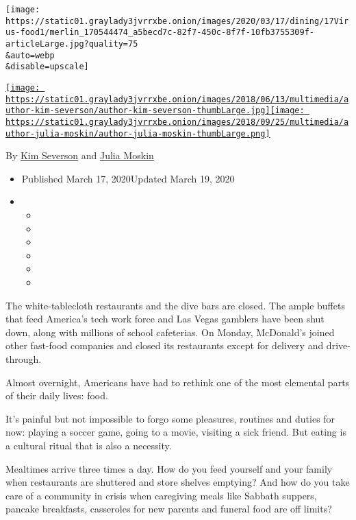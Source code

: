 \texttt{[image: https://static01.graylady3jvrrxbe.onion/images/2020/03/17/dining/17Virus-food1/merlin\_170544474\_a5becd7c-82f7-450c-8f7f-10fb3755309f-articleLarge.jpg?quality=75\\\&auto=webp\\\&disable=upscale]}

\href{https://www.nytimes3xbfgragh.onion/by/kim-severson}{\texttt{[image: https://static01.graylady3jvrrxbe.onion/images/2018/06/13/multimedia/author-kim-severson/author-kim-severson-thumbLarge.jpg]}}\href{https://www.nytimes3xbfgragh.onion/by/julia-moskin}{\texttt{[image: https://static01.graylady3jvrrxbe.onion/images/2018/09/25/multimedia/author-julia-moskin/author-julia-moskin-thumbLarge.png]}}

By \href{https://www.nytimes3xbfgragh.onion/by/kim-severson}{Kim
Severson} and
\href{https://www.nytimes3xbfgragh.onion/by/julia-moskin}{Julia Moskin}

\begin{itemize}
\item
  Published March 17, 2020Updated March 19, 2020
\item
  \begin{itemize}
  \item
  \item
  \item
  \item
  \item
  \item
  \end{itemize}
\end{itemize}

The white-tablecloth restaurants and the dive bars are closed. The ample
buffets that feed America's tech work force and Las Vegas gamblers have
been shut down, along with millions of school cafeterias. On Monday,
McDonald's joined other fast-food companies and closed its restaurants
except for delivery and drive-through.

Almost overnight, Americans have had to rethink one of the most
elemental parts of their daily lives: food.

It's painful but not impossible to forgo some pleasures, routines and
duties for now: playing a soccer game, going to a movie, visiting a sick
friend. But eating is a cultural ritual that is also a necessity.

Mealtimes arrive three times a day. How do you feed yourself and your
family when restaurants are shuttered and store shelves emptying? And
how do you take care of a community in crisis when caregiving meals like
Sabbath suppers, pancake breakfasts, casseroles for new parents and
funeral food are off limits?

